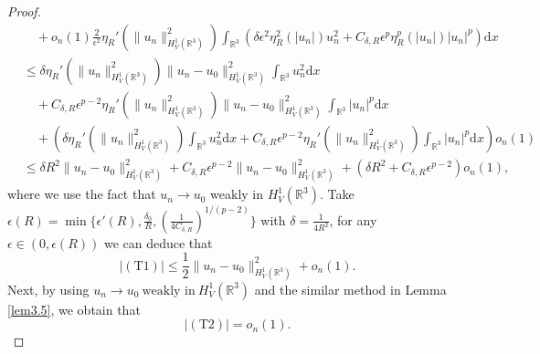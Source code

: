 \documentclass[12pt]{amsart}
\numberwithin{equation}{section}
\theoremstyle{definition}
\begin{document}
\begin{proof}
\begin{equation*}
\begin{aligned}
      &\quad+o_{n}(1)\frac{2}{\epsilon^2} \eta_R'(\|u_n\|_{H^1_{V}(\mathbb{R}^3)}^2)\int_{\mathbb{R}^{3}}\left ( \delta \epsilon ^{2} \eta _{R}^{2}\left ( \left | u_n\right | \right )u_n^{2}+C_{\delta,R}\epsilon ^{p}\eta _{R}^{p}\left ( \left | u_n\right | \right )\left | u_n\right |^{p}\right )\text{d}x\\
      &\leq\delta \eta_R'(\|u_n\|_{H^1_{V}(\mathbb{R}^3)}^2) \|u_n-u_0\|^2_{H^{1}_{V}(\mathbb{R}^3)}\int_{\mathbb{R}^{3}}u_n^{2}\text{d}x \\
      &\quad+C_{\delta,R}\epsilon ^{p-2}\eta_R'(\|u_n\|_{H^1_{V}(\mathbb{R}^3)}^2)\|u_n-u_0\|^2_{H^{1}_{V}(\mathbb{R}^3)}\int_{\mathbb{R}^{3}}\left | u_n\right |^{p}\text{d}x\\
      &\quad+(\delta \eta_R'(\|u_n\|_{H^1_{V}(\mathbb{R}^3)}^2)\int_{\mathbb{R}^{3}}u_n^{2}\text{d}x+C_{\delta,R}\epsilon ^{p-2}\eta_R'(\|u_n\|_{H^1_{V}(\mathbb{R}^3)}^2)\int_{\mathbb{R}^{3}}\left | u_n\right |^{p}\text{d}x)o_{n}(1) \\
    &\leq \delta R^2\|u_n-u_0\|_{H^{1}_{V}(\mathbb{R}^3)}^{2}+C_{\delta,R}\epsilon ^{p-2}\|u_n-u_0\|_{H^{1}_{V}(\mathbb{R}^3)}^{2}+(\delta R^2+C_{\delta,R}\epsilon ^{p-2})o_{n}(1),
    \end{aligned}
\end{equation*}
where we use the fact that $u_n\to u_0$ weakly in $H^1_{V}(\mathbb{R}^3)$. Take $\epsilon(R)=\min\{\epsilon'(R),\frac{\delta_0}{R},\left(\frac{1}{4C_{\delta,R}}\right)^{1/(p-2)}\}$ with $\delta=\frac{1}{4R^2}$, for any $\epsilon\in(0,\epsilon(R))$ we can deduce that $$|(\text{T}1)|\leq \frac{1}{2}\|u_n-u_0\|_{H^{1}_{V}(\mathbb{R}^3)}^{2}+o_{n}(1).$$
Next, by using $u_{n} \to u _{0}~ \text{weakly~in}~H_{V}^{1}\left ( \mathbb{R}^{3}\right )$ and the similar method in Lemma \ref{lem3.5}, we obtain that
$$|(\text{T}2)|=o_{n}\left ( 1 \right ).$$


\end{proof}
\end{document}
